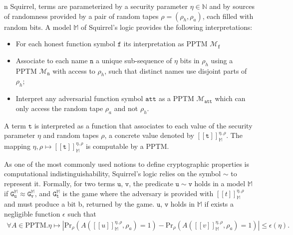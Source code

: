 n Squirrel, terms are parameterized by a security parameter $\eta \in \mathbb{N}$ and by sources of randomness provided by a pair of random tapes $\rho=(\rho_h,\rho_a)$, each filled with random bits. A model $\mathbb{M}$ of Squirrel's logic provides the following interpretations:
\begin{itemize}
    \item For each honest function symbol $\mathtt{f}$ its interpretation as PPTM $\mathcal{M}_\mathtt{f}$
    \item Associate to each name $\mathtt{n}$ a unique sub-sequence of $\eta$ bits in $\rho_h$ using a PPTM $\mathcal{M}_\mathtt{n}$ with access to $\rho_h$, such that distinct names use disjoint parts of $\rho_h$;
    \item Interpret any adversarial function symbol $\mathtt{att}$ as a PPTM $\mathcal{M}_\mathtt{att}$ which can only access the random tape $\rho_a$ and not $\rho_h$.
\end{itemize}
A term $\mathtt{t}$ is interpreted as a function that associates to each value of the security parameter $\eta$ and random tapes $\rho$, a concrete value denoted by $[\![\mathtt{t}]\!]_\mathbb{M}^{\eta, \rho}$. The mapping $\eta, \rho \mapsto [\![\mathtt{t}]\!]_\mathbb{M}^{\eta, \rho}$ is computable by a PPTM.

As one of the most commonly used notions to define cryptographic properties is computational indistinguishability, Squirrel's logic relies on the symbol $\sim$ to represent it. Formally, for two terms $\mathtt{u}$, $\mathtt{v}$, the predicate $\mathtt{u} \sim \mathtt{v}$ holds in a model $\mathbb{M}$ if $\mathtt{G}^\mathbb{M}_\mathtt{u} \approx \mathtt{G}^\mathbb{M}_\mathtt{v}$, and $\mathtt{G}^\mathbb{M}_\mathtt{t}$ is the game where the adversary is provided with $[\![t]\!]_\mathbb{M}^{\eta, \rho}$ and must produce a bit b, returned by the game. $\mathtt{u}$, $\mathtt{v}$ holds in $\mathbb{M}$ if exists a negligible function $\epsilon$ such that
\begin{align*}
\forall A \in \mathrm{PPTM}. \eta \mapsto \left|\mathrm{Pr}_\rho(A([\![u]\!]_\mathbb{M}^{\eta, \rho},\rho_a)=1) - \mathrm{Pr}_\rho(A([\![v]\!]_\mathbb{M}^{\eta, \rho},\rho_a)=1)\right| \leq \epsilon(\eta).
\end{align*}

